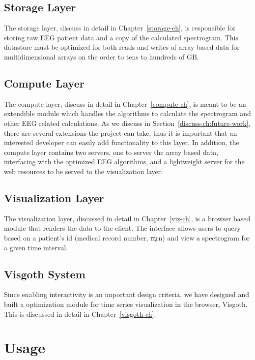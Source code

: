 \subsection{Storage Layer}

The storage layer, discuss in detail in Chapter~\ref{storage-ch}, is
responsible for storing raw EEG patient data and a copy of the calculated
spectrogram. This datastore must be optimized for both reads and writes of
array based data for multidimensional arrays on the order to tens to hundreds
of GB.

\subsection{Compute Layer}

The compute layer, discuss in detail in Chapter~\ref{compute-ch}, is meant to
be an extendible module which handles the algorithms to calculate the
spectrogram and other EEG related calculations. As we discuss in
Section~\ref{discuss-ch:future-work}, there are several extensions the project
can take, thus it is important that an interested developer can easily add
functionality to this layer. In addition, the compute layer contains two
servers, one to server the array based data, interfacing with the optimized EEG
algorithms, and a lightweight server for the web resources to be served to the
visualization layer.

\subsection{Visualization Layer}

The visualization layer, discussed in detail in Chapter~\ref{viz-ch}, is a browser
based module that renders the data to the client. The interface allows users to
query based on a patient's id (medical record number, \c{mrn}) and view a spectrogram
for a given time interval.

\subsection{Visgoth System}

Since enabling interactivity is an important design criteria, we have designed
and built a optimization module for time series visualization in the browser,
Visgoth. This is discussed in detail in Chapter~\ref{visgoth-ch}.

\section{Usage}

